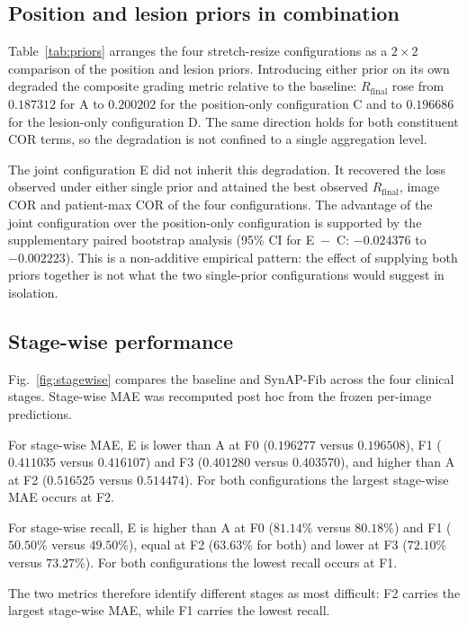 \subsection{Position and lesion priors in combination}

Table~\ref{tab:priors} arranges the four stretch-resize configurations as a
$2\times2$ comparison of the position and lesion priors. Introducing either
prior on its own degraded the composite grading metric relative to the
baseline: $R_{\mathrm{final}}$ rose from $0.187312$ for A to $0.200202$ for the
position-only configuration C and to $0.196686$ for the lesion-only
configuration D. The same direction holds for both constituent COR terms, so
the degradation is not confined to a single aggregation level.

The joint configuration E did not inherit this degradation. It recovered the
loss observed under either single prior and attained the best observed
$R_{\mathrm{final}}$, image COR and patient-max COR of the four
configurations. The advantage of the joint configuration over the position-only
configuration is supported by the supplementary paired bootstrap analysis
(95\% CI for E~$-$~C: $-0.024376$ to $-0.002223$). This is a non-additive
empirical pattern: the effect of supplying both priors together is not what the
two single-prior configurations would suggest in isolation.

\subsection{Stage-wise performance}

Fig.~\ref{fig:stagewise} compares the baseline and SynAP-Fib across the four
clinical stages. Stage-wise MAE was recomputed post hoc from the frozen
per-image predictions.

For stage-wise MAE, E is lower than A at F0 ($0.196277$ versus $0.196508$),
F1 ($0.411035$ versus $0.416107$) and F3 ($0.401280$ versus $0.403570$), and
higher than A at F2 ($0.516525$ versus $0.514474$). For both configurations
the largest stage-wise MAE occurs at F2.

For stage-wise recall, E is higher than A at F0 ($81.14\%$ versus $80.18\%$)
and F1 ($50.50\%$ versus $49.50\%$), equal at F2 ($63.63\%$ for both) and lower
at F3 ($72.10\%$ versus $73.27\%$). For both configurations the lowest recall
occurs at F1.

The two metrics therefore identify different stages as most difficult: F2
carries the largest stage-wise MAE, while F1 carries the lowest recall.

